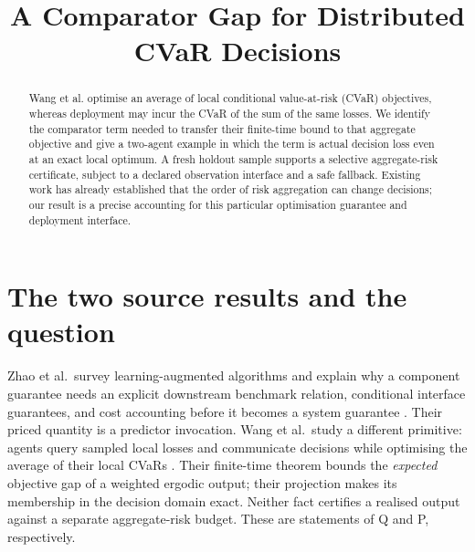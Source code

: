 \documentclass{article}
\title{A Comparator Gap for Distributed CVaR Decisions}
\begin{document}
\maketitle

\begin{abstract}
Wang et al. optimise an average of local conditional value-at-risk
(CVaR) objectives, whereas deployment may incur the CVaR of the sum of
the same losses.  We identify the comparator term needed to transfer
their finite-time bound to that aggregate objective and give a two-agent
example in which the term is actual decision loss even at an exact local
optimum.  A fresh holdout sample supports a selective aggregate-risk
certificate, subject to a declared observation interface and a safe
fallback.  Existing work has already established that the order of risk
aggregation can change decisions; our result is a precise accounting for
this particular optimisation guarantee and deployment interface.
\end{abstract}

\section{The two source results and the question}

Zhao et al.\ survey learning-augmented algorithms and explain why a
component guarantee needs an explicit downstream benchmark relation,
conditional interface guarantees, and cost accounting before it becomes
a system guarantee \cite{Q}.  Their priced quantity is a predictor
invocation.  Wang et al.\ study a different primitive: agents query
sampled local losses and communicate decisions while optimising the
average of their local CVaRs \cite{P}.  Their finite-time theorem bounds
the \emph{expected} objective gap of a weighted ergodic output; their
projection makes its membership in the decision domain exact.  Neither
fact certifies a realised output against a separate aggregate-risk
budget.  These are statements of Q and P, respectively.
\end{document}
